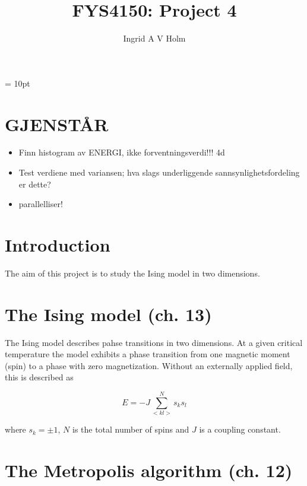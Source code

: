 \documentclass[11pt]{article}
\begin{document}
\title{FYS4150: Project 4}
\author{Ingrid A V Holm}
\maketitle


\marginparwidth = 10pt


\section{GJENSTÅR}

\begin{itemize}
\item Finn histogram av ENERGI, ikke forventningsverdi!!! 4d
\item Test verdiene med variansen; hva slags underliggende sannsynlighetsfordeling er dette?
\item parallelliser!
\end{itemize}


\section{Introduction}

\begin{flushleft}
The aim of this project is to study the Ising model in two dimensions.
\end{flushleft}

\section{The Ising model (ch. 13)}

\begin{flushleft}
The Ising model describes pahse transitions in two dimensions. At a given critical temperature the model exhibits a phase transition from one magnetic moment (spin) to a phase with zero magnetization. Without an externally applied field, this is described as

\begin{equation}
E = -J \sum^N_{<kl>} s_k s_l
\end{equation}

where $s_k = \pm 1$, $N$ is the total number of spins and $J$ is a coupling constant.
\end{flushleft}

\section{The Metropolis algorithm (ch. 12)}
\end{document}
